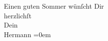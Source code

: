 \begin{ledgroupsized}[t]{13cm}
           \pstart
           Einen guten Sommer wünſcht Dir{\\[\baselineskip]}herzlichſt{\\[\baselineskip]}Dein{\\[\baselineskip]}\spacefill\mbox{Hermann}\pend
           \leftskip=0em{}\endnumbering{}\end{ledgroupsized}  \newcommand{\dateiname}{L01143}\newcommand{\titel}{Hermann Bahr an Arthur Schnitzler, 5. 7. 1901}\newcommand{\editorInnen}{ Kurt Ifkovits,  Martin Anton Müller}
            \footnotesize
\begin{ledgroupsized}[t]{11.5cm}
\end{ledgroupsized}
         
      